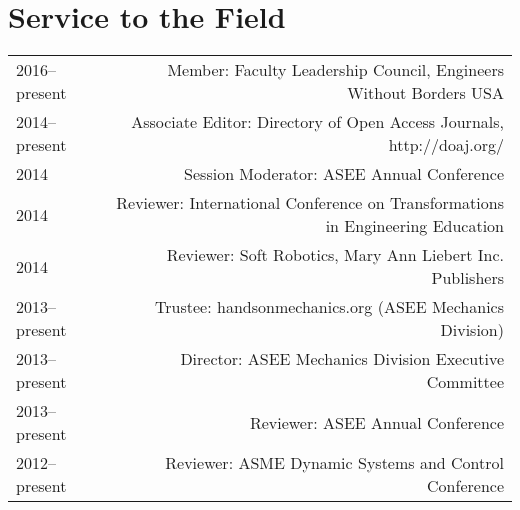 \section*{Service to the Field}
\begin{tabular}{L!{\VRule}R}
2016--present&Member: Faculty Leadership Council, Engineers Without Borders USA\\
2014--present&Associate Editor: Directory of Open Access Journals, http://doaj.org/\\
2014&Session Moderator: ASEE Annual Conference\\
2014&Reviewer: International Conference on Transformations in Engineering Education\\
2014&Reviewer: Soft Robotics, Mary Ann Liebert Inc. Publishers\\
2013--present&Trustee: handsonmechanics.org (ASEE Mechanics Division)\\
2013--present&Director: ASEE Mechanics Division Executive Committee\\
2013--present&Reviewer: ASEE Annual Conference\\
2012--present&Reviewer: ASME Dynamic Systems and Control Conference\\
\end{tabular}